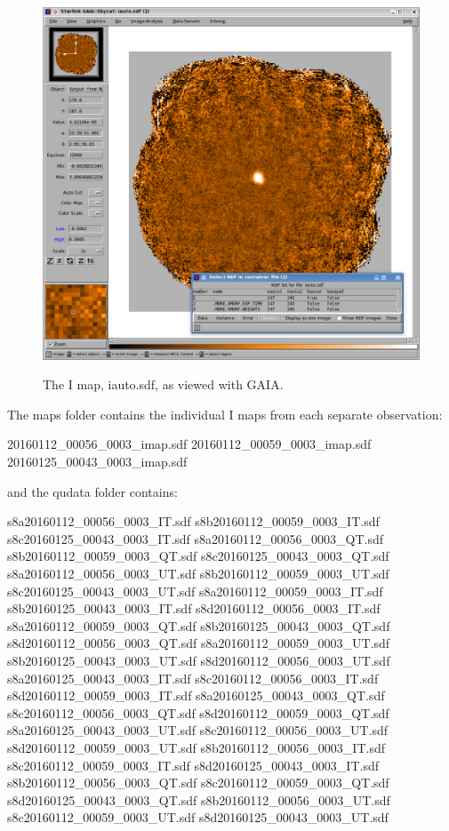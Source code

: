\begin{figure}[t!]
\begin{center}
\includegraphics[width=0.8\linewidth]{sc22-gaia-view-iauto.png}
\label{fig:gaia-iauto}
\caption [I map in GAIA]{
  \small The I map, iauto.sdf, as viewed with GAIA.
}
\end{center}
\end{figure}

The maps folder contains the individual I maps from each separate
observation:

\begin{terminalv}
20160112_00056_0003_imap.sdf  20160112_00059_0003_imap.sdf  20160125_00043_0003_imap.sdf
\end{terminalv}

and the qudata folder contains:

\begin{terminalv}
s8a20160112_00056_0003_IT.sdf  s8b20160112_00059_0003_IT.sdf  s8c20160125_00043_0003_IT.sdf
s8a20160112_00056_0003_QT.sdf  s8b20160112_00059_0003_QT.sdf  s8c20160125_00043_0003_QT.sdf
s8a20160112_00056_0003_UT.sdf  s8b20160112_00059_0003_UT.sdf  s8c20160125_00043_0003_UT.sdf
s8a20160112_00059_0003_IT.sdf  s8b20160125_00043_0003_IT.sdf  s8d20160112_00056_0003_IT.sdf
s8a20160112_00059_0003_QT.sdf  s8b20160125_00043_0003_QT.sdf  s8d20160112_00056_0003_QT.sdf
s8a20160112_00059_0003_UT.sdf  s8b20160125_00043_0003_UT.sdf  s8d20160112_00056_0003_UT.sdf
s8a20160125_00043_0003_IT.sdf  s8c20160112_00056_0003_IT.sdf  s8d20160112_00059_0003_IT.sdf
s8a20160125_00043_0003_QT.sdf  s8c20160112_00056_0003_QT.sdf  s8d20160112_00059_0003_QT.sdf
s8a20160125_00043_0003_UT.sdf  s8c20160112_00056_0003_UT.sdf  s8d20160112_00059_0003_UT.sdf
s8b20160112_00056_0003_IT.sdf  s8c20160112_00059_0003_IT.sdf  s8d20160125_00043_0003_IT.sdf
s8b20160112_00056_0003_QT.sdf  s8c20160112_00059_0003_QT.sdf  s8d20160125_00043_0003_QT.sdf
s8b20160112_00056_0003_UT.sdf  s8c20160112_00059_0003_UT.sdf  s8d20160125_00043_0003_UT.sdf
\end{terminalv}


